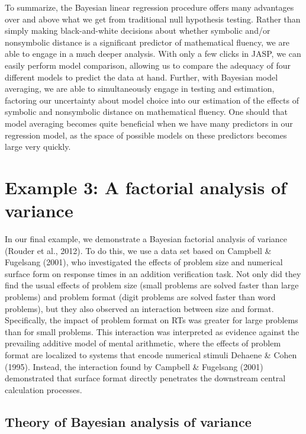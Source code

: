 \documentclass[english,,doc,floatsintext]{apa6}
\begin{document}
To summarize, the Bayesian linear regression procedure offers many advantages over and above what we get from traditional null hypothesis testing. Rather than simply making black-and-white decisions about whether symbolic and/or nonsymbolic distance is a significant predictor of mathematical fluency, we are able to engage in a much deeper analysis. With only a few clicks in JASP, we can easily perform model comparison, allowing us to compare the adequacy of four different models to predict the data at hand. Further, with Bayesian model averaging, we are able to simultaneously engage in testing and estimation, factoring our uncertainty about model choice into our estimation of the effects of symbolic and nonsymbolic distance on mathematical fluency. One should that model averaging becomes quite beneficial when we have many predictors in our regression model, as the space of possible models on these predictors becomes large very quickly.

\hypertarget{example-3-a-factorial-analysis-of-variance}{%
\section{Example 3: A factorial analysis of variance}\label{example-3-a-factorial-analysis-of-variance}}

In our final example, we demonstrate a Bayesian factorial analysis of variance (Rouder et al., 2012). To do this, we use a data set based on Campbell \& Fugelsang (2001), who investigated the effects of problem size and numerical surface form on response times in an addition verification task. Not only did they find the usual effects of problem size (small problems are solved faster than large problems) and problem format (digit problems are solved faster than word problems), but they also observed an interaction between size and format. Specifically, the impact of problem format on RTs was greater for large problems than for small problems. This interaction was interpreted as evidence against the prevailing additive model of mental arithmetic, where the effects of problem format are localized to systems that encode numerical stimuli Dehaene \& Cohen (1995). Instead, the interaction found by Campbell \& Fugelsang (2001) demonstrated that surface format directly penetrates the downstream central calculation processes.

\hypertarget{theory-of-bayesian-analysis-of-variance}{%
\subsection{Theory of Bayesian analysis of variance}\label{theory-of-bayesian-analysis-of-variance}}
\end{document}
